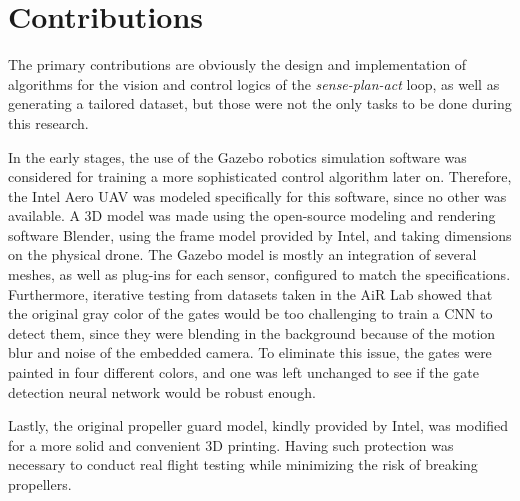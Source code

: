 \section{Contributions}

The primary contributions are obviously the design and implementation of
algorithms for the vision and control logics of the \emph{sense-plan-act} loop,
as well as generating a tailored dataset, but those were not the only tasks to
be done during this research.

In the early stages, the use of the Gazebo robotics simulation software was
considered for training a more sophisticated control algorithm later on.
Therefore, the Intel Aero UAV was modeled specifically for this software,
since no other was available. A 3D model was made using the open-source
modeling and rendering software Blender, using the frame model provided by
Intel, and taking dimensions on the physical drone. The Gazebo model is mostly
an integration of several meshes, as well as plug-ins for each sensor, configured
to match the specifications.
Furthermore, iterative testing from datasets taken in the AiR Lab showed that
the original gray color of the gates would be too challenging to train a CNN to
detect them, since they were blending in the background because of the motion
blur and noise of the embedded camera. To eliminate this issue, the gates were
painted in four different colors, and one was left unchanged to see if the gate
detection neural network would be robust enough.

Lastly, the original propeller guard model, kindly provided by Intel, was
modified for a more solid and convenient 3D printing. Having such protection was
necessary to conduct real flight testing while minimizing the risk of breaking
propellers.

